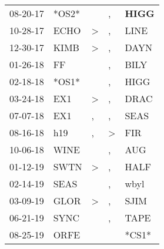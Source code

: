 \begin{supertabular}{p{0.07\textwidth}p{0.06\textwidth}p{0.02\textwidth}p{0.02\textwidth}p{0.06\textwidth}}
          08-20-17\textsuperscript{} &                            *OS2* &                  &                , &  \textbf{HIGG\textsuperscript{}} \\
          10-28-17\textsuperscript{} &           ECHO\textsuperscript{} &     \textgreater &                , &           LINE\textsuperscript{} \\
          12-30-17\textsuperscript{} &           KIMB\textsuperscript{} &     \textgreater &                , &           DAYN\textsuperscript{} \\
          01-26-18\textsuperscript{} &             FF\textsuperscript{} &                  &                , &           BILY\textsuperscript{} \\
          02-18-18\textsuperscript{} &                            *OS1* &                  &                , &           HIGG\textsuperscript{} \\
          03-24-18\textsuperscript{} &            EX1\textsuperscript{} &     \textgreater &                , &           DRAC\textsuperscript{} \\
          07-07-18\textsuperscript{} &            EX1\textsuperscript{} &                , &                , &           SEAS\textsuperscript{} \\
          08-16-18\textsuperscript{} &            h19\textsuperscript{} &                , &     \textgreater &            FIR\textsuperscript{} \\
          10-06-18\textsuperscript{} &           WINE\textsuperscript{} &                  &                , &            AUG\textsuperscript{} \\
          01-12-19\textsuperscript{} &           SWTN\textsuperscript{} &     \textgreater &                , &           HALF\textsuperscript{} \\
          02-14-19\textsuperscript{} &           SEAS\textsuperscript{} &                  &                , &           wbyl\textsuperscript{} \\
          03-09-19\textsuperscript{} &           GLOR\textsuperscript{} &     \textgreater &                , &           SJIM\textsuperscript{} \\
          06-21-19\textsuperscript{} &           SYNC\textsuperscript{} &                  &                , &           TAPE\textsuperscript{} \\
          08-25-19\textsuperscript{} &           ORFE\textsuperscript{} &                  &                  &                            *CS1* \\

\end{supertabular}
